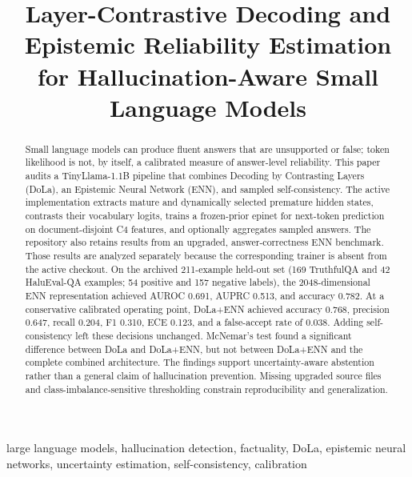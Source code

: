 \documentclass[conference]{IEEEtran}
\begin{document}
\title{Layer-Contrastive Decoding and Epistemic Reliability Estimation for Hallucination-Aware Small Language Models}

\author{
}
\maketitle

\begin{abstract}
Small language models can produce fluent answers that are unsupported or false; token likelihood is not, by itself, a calibrated measure of answer-level reliability. This paper audits a TinyLlama-1.1B pipeline that combines Decoding by Contrasting Layers (DoLa), an Epistemic Neural Network (ENN), and sampled self-consistency. The active implementation extracts mature and dynamically selected premature hidden states, contrasts their vocabulary logits, trains a frozen-prior epinet for next-token prediction on document-disjoint C4 features, and optionally aggregates sampled answers. The repository also retains results from an upgraded, answer-correctness ENN benchmark. Those results are analyzed separately because the corresponding trainer is absent from the active checkout. On the archived 211-example held-out set (169 TruthfulQA and 42 HaluEval-QA examples; 54 positive and 157 negative labels), the 2048-dimensional ENN representation achieved AUROC 0.691, AUPRC 0.513, and accuracy 0.782. At a conservative calibrated operating point, DoLa+ENN achieved accuracy 0.768, precision 0.647, recall 0.204, F1 0.310, ECE 0.123, and a false-accept rate of 0.038. Adding self-consistency left these decisions unchanged. McNemar's test found a significant difference between DoLa and DoLa+ENN, but not between DoLa+ENN and the complete combined architecture. The findings support uncertainty-aware abstention rather than a general claim of hallucination prevention. Missing upgraded source files and class-imbalance-sensitive thresholding constrain reproducibility and generalization.
\end{abstract}

\begin{IEEEkeywords}
large language models, hallucination detection, factuality, DoLa, epistemic neural networks, uncertainty estimation, self-consistency, calibration
\end{IEEEkeywords}
\end{document}

